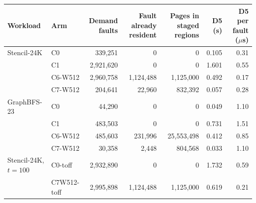 \begin{tabular}{@{}llrrrrr@{}}
\toprule
Workload & Arm & Demand faults & Fault already resident & Pages in staged regions & D5 (s) & D5 per fault ($\mu$s) \\
\midrule
Stencil-24K & C0 & 339{,}251 & 0 & 0 & 0.105 & 0.31 \\ %
 & C1 & 2{,}921{,}620 & 0 & 0 & 1.601 & 0.55 \\ %
 & C6-W512 & 2{,}960{,}758 & 1{,}124{,}488 & 1{,}125{,}000 & 0.492 & 0.17 \\ %
 & C7-W512 & 204{,}641 & 22{,}960 & 832{,}392 & 0.057 & 0.28 \\ %
\midrule
GraphBFS-23 & C0 & 44{,}290 & 0 & 0 & 0.049 & 1.10 \\ %
 & C1 & 483{,}503 & 0 & 0 & 0.731 & 1.51 \\ %
 & C6-W512 & 485{,}603 & 231{,}996 & 25{,}553{,}498 & 0.412 & 0.85 \\ %
 & C7-W512 & 30{,}358 & 2{,}448 & 804{,}568 & 0.033 & 1.10 \\ %
\midrule
Stencil-24K, $t{=}100$ & C0-toff & 2{,}932{,}890 & 0 & 0 & 1.732 & 0.59 \\ %
 & C7W512-toff & 2{,}995{,}898 & 1{,}124{,}488 & 1{,}125{,}000 & 0.619 & 0.21 \\ %
\bottomrule
\end{tabular}
